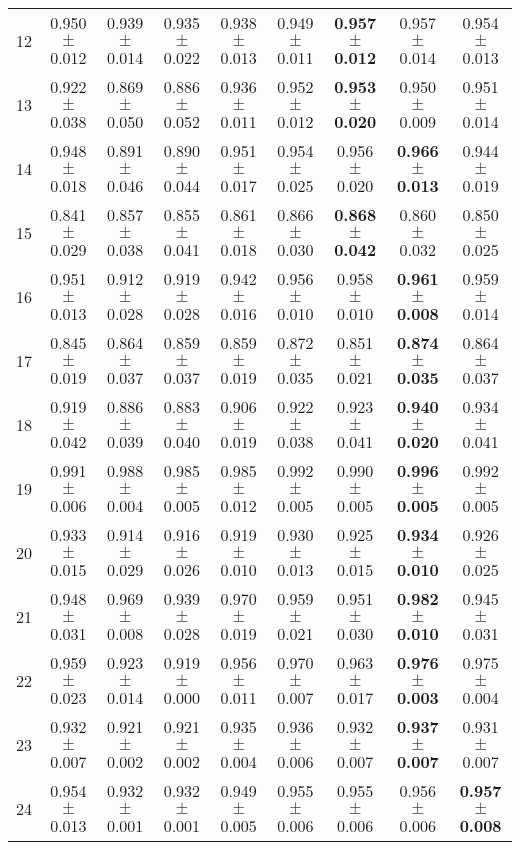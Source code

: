 \begin{table}[!ht]
{\begin{tabular}{r c c c c c c c c}
12 & 0.950 $\pm$ 0.012 & 0.939 $\pm$ 0.014 & 0.935 $\pm$ 0.022 & 0.938 $\pm$ 0.013 & 0.949 $\pm$ 0.011 & \textbf{0.957 $\pm$ 0.012} & 0.957 $\pm$ 0.014 & 0.954 $\pm$ 0.013 \\
13 & 0.922 $\pm$ 0.038 & 0.869 $\pm$ 0.050 & 0.886 $\pm$ 0.052 & 0.936 $\pm$ 0.011 & 0.952 $\pm$ 0.012 & \textbf{0.953 $\pm$ 0.020} & 0.950 $\pm$ 0.009 & 0.951 $\pm$ 0.014 \\
14 & 0.948 $\pm$ 0.018 & 0.891 $\pm$ 0.046 & 0.890 $\pm$ 0.044 & 0.951 $\pm$ 0.017 & 0.954 $\pm$ 0.025 & 0.956 $\pm$ 0.020 & \textbf{0.966 $\pm$ 0.013} & 0.944 $\pm$ 0.019 \\
15 & 0.841 $\pm$ 0.029 & 0.857 $\pm$ 0.038 & 0.855 $\pm$ 0.041 & 0.861 $\pm$ 0.018 & 0.866 $\pm$ 0.030 & \textbf{0.868 $\pm$ 0.042} & 0.860 $\pm$ 0.032 & 0.850 $\pm$ 0.025 \\
16 & 0.951 $\pm$ 0.013 & 0.912 $\pm$ 0.028 & 0.919 $\pm$ 0.028 & 0.942 $\pm$ 0.016 & 0.956 $\pm$ 0.010 & 0.958 $\pm$ 0.010 & \textbf{0.961 $\pm$ 0.008} & 0.959 $\pm$ 0.014 \\
17 & 0.845 $\pm$ 0.019 & 0.864 $\pm$ 0.037 & 0.859 $\pm$ 0.037 & 0.859 $\pm$ 0.019 & 0.872 $\pm$ 0.035 & 0.851 $\pm$ 0.021 & \textbf{0.874 $\pm$ 0.035} & 0.864 $\pm$ 0.037 \\
18 & 0.919 $\pm$ 0.042 & 0.886 $\pm$ 0.039 & 0.883 $\pm$ 0.040 & 0.906 $\pm$ 0.019 & 0.922 $\pm$ 0.038 & 0.923 $\pm$ 0.041 & \textbf{0.940 $\pm$ 0.020} & 0.934 $\pm$ 0.041 \\
19 & 0.991 $\pm$ 0.006 & 0.988 $\pm$ 0.004 & 0.985 $\pm$ 0.005 & 0.985 $\pm$ 0.012 & 0.992 $\pm$ 0.005 & 0.990 $\pm$ 0.005 & \textbf{0.996 $\pm$ 0.005} & 0.992 $\pm$ 0.005 \\
20 & 0.933 $\pm$ 0.015 & 0.914 $\pm$ 0.029 & 0.916 $\pm$ 0.026 & 0.919 $\pm$ 0.010 & 0.930 $\pm$ 0.013 & 0.925 $\pm$ 0.015 & \textbf{0.934 $\pm$ 0.010} & 0.926 $\pm$ 0.025 \\
21 & 0.948 $\pm$ 0.031 & 0.969 $\pm$ 0.008 & 0.939 $\pm$ 0.028 & 0.970 $\pm$ 0.019 & 0.959 $\pm$ 0.021 & 0.951 $\pm$ 0.030 & \textbf{0.982 $\pm$ 0.010} & 0.945 $\pm$ 0.031 \\
22 & 0.959 $\pm$ 0.023 & 0.923 $\pm$ 0.014 & 0.919 $\pm$ 0.000 & 0.956 $\pm$ 0.011 & 0.970 $\pm$ 0.007 & 0.963 $\pm$ 0.017 & \textbf{0.976 $\pm$ 0.003} & 0.975 $\pm$ 0.004 \\
23 & 0.932 $\pm$ 0.007 & 0.921 $\pm$ 0.002 & 0.921 $\pm$ 0.002 & 0.935 $\pm$ 0.004 & 0.936 $\pm$ 0.006 & 0.932 $\pm$ 0.007 & \textbf{0.937 $\pm$ 0.007} & 0.931 $\pm$ 0.007 \\
24 & 0.954 $\pm$ 0.013 & 0.932 $\pm$ 0.001 & 0.932 $\pm$ 0.001 & 0.949 $\pm$ 0.005 & 0.955 $\pm$ 0.006 & 0.955 $\pm$ 0.006 & 0.956 $\pm$ 0.006 & \textbf{0.957 $\pm$ 0.008} \\

\end{tabular}}
\end{table}
